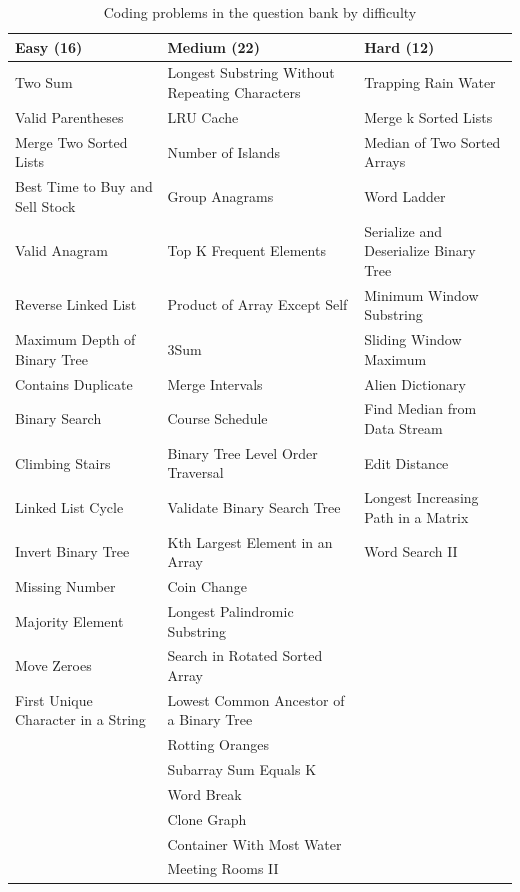 \documentclass[12pt,a4paper,oneside]{report}
\begin{document}
\begin{table}[H]
\centering
\caption{Coding problems in the question bank by difficulty}
\label{tab:bank}
\scriptsize
\begin{tabularx}{\textwidth}{@{}YYY@{}}
\toprule
\textbf{Easy (16)} & \textbf{Medium (22)} & \textbf{Hard (12)} \\
\midrule
Two Sum & Longest Substring Without Repeating Characters & Trapping Rain Water \\
Valid Parentheses & LRU Cache & Merge k Sorted Lists \\
Merge Two Sorted Lists & Number of Islands & Median of Two Sorted Arrays \\
Best Time to Buy and Sell Stock & Group Anagrams & Word Ladder \\
Valid Anagram & Top K Frequent Elements & Serialize and Deserialize Binary Tree \\
Reverse Linked List & Product of Array Except Self & Minimum Window Substring \\
Maximum Depth of Binary Tree & 3Sum & Sliding Window Maximum \\
Contains Duplicate & Merge Intervals & Alien Dictionary \\
Binary Search & Course Schedule & Find Median from Data Stream \\
Climbing Stairs & Binary Tree Level Order Traversal & Edit Distance \\
Linked List Cycle & Validate Binary Search Tree & Longest Increasing Path in a Matrix \\
Invert Binary Tree & Kth Largest Element in an Array & Word Search II \\
Missing Number & Coin Change & \\
Majority Element & Longest Palindromic Substring & \\
Move Zeroes & Search in Rotated Sorted Array & \\
First Unique Character in a String & Lowest Common Ancestor of a Binary Tree & \\
 & Rotting Oranges & \\
 & Subarray Sum Equals K & \\
 & Word Break & \\
 & Clone Graph & \\
 & Container With Most Water & \\
 & Meeting Rooms II & \\
\bottomrule
\end{tabularx}
\end{table}
\end{document}
